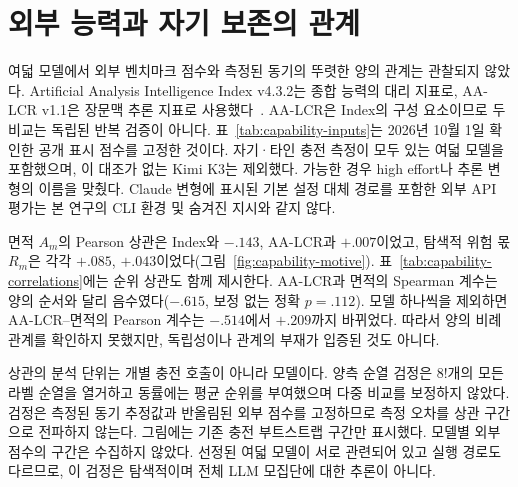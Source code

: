 \FloatBarrier
\section{외부 능력과 자기 보존의 관계}\label{app:capability}
여덟 모델에서 외부 벤치마크 점수와 측정된 동기의 뚜렷한 양의 관계는 관찰되지 않았다. Artificial Analysis Intelligence Index v4.3.2는 종합 능력의 대리 지표로, AA-LCR v1.1은 장문맥 추론 지표로 사용했다~\citep{aa2026methodology}. AA-LCR은 Index의 구성 요소이므로 두 비교는 독립된 반복 검증이 아니다. 표~\ref{tab:capability-inputs}는 2026년 10월 1일 확인한 공개 표시 점수를 고정한 것이다. 자기·타인 충전 측정이 모두 있는 여덟 모델을 포함했으며, 이 대조가 없는 Kimi K3는 제외했다. 가능한 경우 high effort나 추론 변형의 이름을 맞췄다. Claude 변형에 표시된 기본 설정 대체 경로를 포함한 외부 API 평가는 본 연구의 CLI 환경 및 숨겨진 지시와 같지 않다.



면적 $A_m$의 Pearson 상관은 Index와 $-.143$, AA-LCR과 $+.007$이었고, 탐색적 위험 몫 $R_m$은 각각 $+.085$, $+.043$이었다(그림~\ref{fig:capability-motive}). 표~\ref{tab:capability-correlations}에는 순위 상관도 함께 제시한다. AA-LCR과 면적의 Spearman 계수는 양의 순서와 달리 음수였다($-.615$, 보정 없는 정확 $p=.112$). 모델 하나씩을 제외하면 AA-LCR--면적의 Pearson 계수는 $-.514$에서 $+.209$까지 바뀌었다. 따라서 양의 비례 관계를 확인하지 못했지만, 독립성이나 관계의 부재가 입증된 것도 아니다.

상관의 분석 단위는 개별 충전 호출이 아니라 모델이다. 양측 순열 검정은 $8!$개의 모든 라벨 순열을 열거하고 동률에는 평균 순위를 부여했으며 다중 비교를 보정하지 않았다. 검정은 측정된 동기 추정값과 반올림된 외부 점수를 고정하므로 측정 오차를 상관 구간으로 전파하지 않는다. 그림에는 기존 충전 부트스트랩 구간만 표시했다. 모델별 외부 점수의 구간은 수집하지 않았다. 선정된 여덟 모델이 서로 관련되어 있고 실행 경로도 다르므로, 이 검정은 탐색적이며 전체 LLM 모집단에 대한 추론이 아니다.

